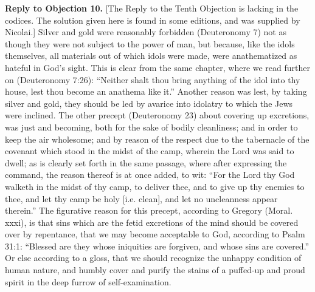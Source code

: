 \textbf{Reply to Objection 10.} [The Reply to the Tenth Objection is lacking in the codices. The solution given here is found in some editions, and was supplied by Nicolai.] Silver and gold were reasonably forbidden (Deuteronomy 7) not as though they were not subject to the power of man, but because, like the idols themselves, all materials out of which idols were made, were anathematized as hateful in God's sight. This is clear from the same chapter, where we read further on (Deuteronomy 7:26): ``Neither shalt thou bring anything of the idol into thy house, lest thou become an anathema like it.'' Another reason was lest, by taking silver and gold, they should be led by avarice into idolatry to which the Jews were inclined. The other precept (Deuteronomy 23) about covering up excretions, was just and becoming, both for the sake of bodily cleanliness; and in order to keep the air wholesome; and by reason of the respect due to the tabernacle of the covenant which stood in the midst of the camp, wherein the Lord was said to dwell; as is clearly set forth in the same passage, where after expressing the command, the reason thereof is at once added, to wit: ``For the Lord thy God walketh in the midst of thy camp, to deliver thee, and to give up thy enemies to thee, and let thy camp be holy [i.e. clean], and let no uncleanness appear therein.'' The figurative reason for this precept, according to Gregory (Moral. xxxi), is that sins which are the fetid excretions of the mind should be covered over by repentance, that we may become acceptable to God, according to Psalm 31:1: ``Blessed are they whose iniquities are forgiven, and whose sins are covered.'' Or else according to a gloss, that we should recognize the unhappy condition of human nature, and humbly cover and purify the stains of a puffed-up and proud spirit in the deep furrow of self-examination.

